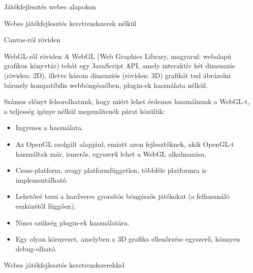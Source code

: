 \begin{MyChapter}{Játékfejlesztés webes alapokon}
\begin{MySection}{Webes játékfejlesztés keretrendszerek nélkül}
		\begin{MySubSection}{Canvas-ról röviden}
		\end{MySubSection}
		
		\begin{MySubSection}{WebGL-ről röviden}
			A WebGL (Web Graphics Library, magyarul: webalapú grafikus könyvtár) tehát egy JavaScript API, amely interaktív két dimenziós (röviden: 2D), illetve három dimenziós (röviden: 3D) grafikát tud ábrázolni bármely kompatibilis webböngészőben, plugin-ek használata nélkül.
			
			Számos előnyt felsorolhatunk, hogy miért lehet érdemes használnunk a WebGL-t, a teljesség igénye nélkül megemlítenék párat közülük:
			\begin{itemize}
				\item Ingyenes a használata.
				\item Az OpenGL szolgált alapjául, emiatt azon fejlesztőknek, akik OpenGL-t használtak már, ismerős, egyszerű lehet a WebGL alkalmazása. 
				\item Cross-platform, avagy platformfüggetlen, többféle platformra is implementálható.
				\item Lehetővé teszi a hardveres gyorsítós böngészős játékokat (a felhasználó eszközétől függően).
				\item Nincs szükség plugin-ek használatára.
				\item Egy olyan környezet, amelyben a 3D grafika ellenőrzése egyszerű, könnyen debug-olható.
			\end{itemize}
		\end{MySubSection}
		
	\end{MySection}

	\begin{MySection}{Webes játékfejlesztés keretrendszerekkel}
		

\end{MySection}
\end{MyChapter}
